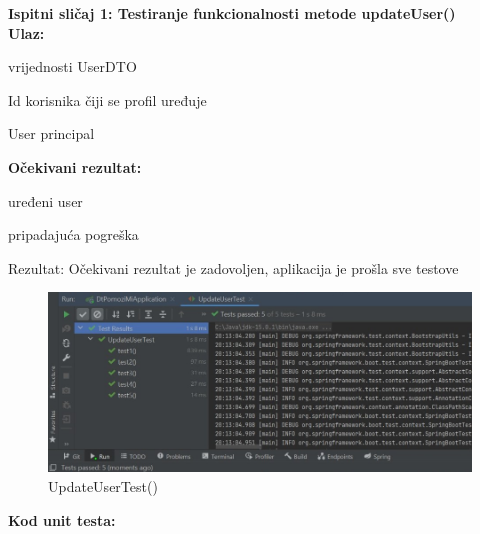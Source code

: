 			\medskip
			
			\noindent \textbf{Ispitni sličaj 1: Testiranje funkcionalnosti metode updateUser()}\\
			
			\medskip
            \noindent\textbf{Ulaz:}
            \begin{packed_enum}
            \item vrijednosti UserDTO
            \item Id korisnika čiji se profil uređuje
            \item User principal
            \end{packed_enum}
            
            \noindent\textbf{Očekivani rezultat:}
            \begin{packed_enum}
            \item uređeni user
            \item pripadajuća pogreška
            \end{packed_enum}
            
            \noindent \text
            Rezultat: Očekivani rezultat je zadovoljen, aplikacija je prošla sve testove \\
            
            \begin{figure}[H]
                 \includegraphics[width=\textwidth, height=\textheight, keepaspectratio]{slike/UpdateUserTest.jpeg}
                \cntering
                \caption{UpdateUserTest()}
            \end{figure}
            
            \noindent \textbf{Kod unit testa: }
            

